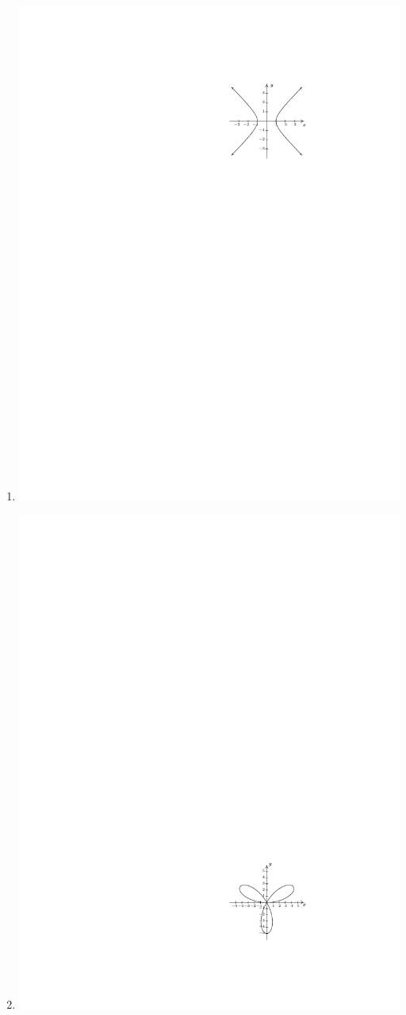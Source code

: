 \documentclass{ximera}
\begin{document}
\begin{exercise}
\begin{enumerate}
\item{\includegraphics{WiaFgraphs1-4}}
\item{\includegraphics{WiaFgraphs1-6}}

\end{enumerate}
\end{exercise}
\end{document}
